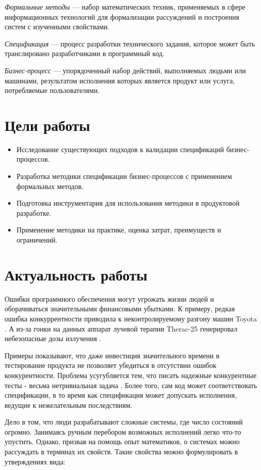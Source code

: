 \documentclass[14pt, openany]{report}
\begin{document}
\emph{Формальные методы} --- набор математических техник, применяемых в сфере информационных технологий для формализации рассуждений и построения систем с изученными свойствами. 

\emph{Спецификация} --- процесс разработки технического задания, которое может быть транслировано разработчиками в программный код.

\emph{Бизнес-процесс} --- упорядоченный набор действий, выполняемых людьми или машинами, результатом исполнения которых является продукт или услуга, потребляемые пользователями.

\section{Цели работы}

\begin{itemize}
  \item Исследование существующих подходов к валидации спецификаций бизнес-процессов.
  \item Разработка методики спецификации бизнес-процессов с применением формальных методов.
  \item Подготовка инструментария для использования методики в продуктовой разработке.
  \item Применение методики на практике, оценка затрат, преимуществ и ограничений.
\end{itemize}

\section{Актуальность работы}
Ошибки программного обеспечения могут угрожать жизни людей и оборачиваться значительными финансовыми убытками. К примеру, редкая ошибка конкуррентности приводила к неконтролируемому разгону машин Toyota \cite{toyota}. А из-за гонки на данных аппарат лучевой терапии Therac-25 генерировал небезопасные дозы излучения \cite{therac}.

Примеры показывают, что даже инвестиция значительного времени в тестирование продукта не позволяет убедиться в отсутствии ошибок конкурентности. Проблема усугубляется тем, что писать надежные конкурентные тесты - весьма нетривиальная задача \cite{xpConcurrent}. Более того, сам код может соответствовать спецификации, в то время как спецификация может допускать исполнения, ведущие к нежелательным последствиям. 

Дело в том, что люди разрабатывают сложные системы, где число состояний огромно. Занимаясь ручным перебором возможных исполнений легко что-то упустить. Однако, призвав на помощь опыт математиков, о системах можно рассуждать в терминах их свойств. Такие свойства можно формулировать в утверждениях вида:
\end{document}
